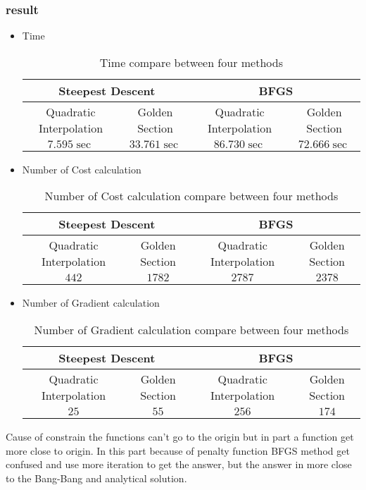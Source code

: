 \subsubsection{result}
\begin{itemize}
\item Time
	\begin{table}[H]
		\caption {Time compare between four methods} 
		\begin{center}
			\begin{tabular}{ |c|c|c|c| }
				\hline
				\multicolumn{2}{|c|}{Steepest Descent} &
				\multicolumn{2}{|c|}{BFGS} \Tstrut\\
				\hline
				Quadratic Interpolation & Golden Section & Quadratic Interpolation &
				Golden Section \Tstrut\\
				\hline
				$7.595\sec$ & $33.761\sec$ & $86.730\sec$ & $72.666\sec$\Tstrut\\
				\hline
			\end{tabular}
		\end{center}
	\end{table}
\item Number of Cost calculation
\begin{table}[H]
	\caption {Number of Cost calculation compare between four methods} 
	\begin{center}
		\begin{tabular}{ |c|c|c|c| }
			\hline
			\multicolumn{2}{|c|}{Steepest Descent} &
			\multicolumn{2}{|c|}{BFGS} \Tstrut\\
			\hline
			Quadratic Interpolation & Golden Section & Quadratic Interpolation &
			Golden Section \Tstrut\\
			\hline
			$442$ & $1782$ & $2787$ & $2378$\Tstrut\\
			\hline
		\end{tabular}
	\end{center}
\end{table}
\item Number of Gradient calculation
\begin{table}[H]
	\caption {Number of Gradient calculation compare between four methods} 
	\begin{center}
		\begin{tabular}{ |c|c|c|c| }
			\hline
			\multicolumn{2}{|c|}{Steepest Descent} &
			\multicolumn{2}{|c|}{BFGS} \Tstrut\\
			\hline
			Quadratic Interpolation & Golden Section & Quadratic Interpolation &
			Golden Section \Tstrut\\
			\hline
			$25$ & $55$ & $256$ & $174$\Tstrut\\
			\hline
		\end{tabular}
	\end{center}
\end{table}
\end{itemize}
Cause of constrain the functions can't go to the origin but in part a function get more close to origin. In this part because of penalty function BFGS method get confused and use more iteration to get the answer, but the answer in more close to the Bang-Bang and analytical solution.